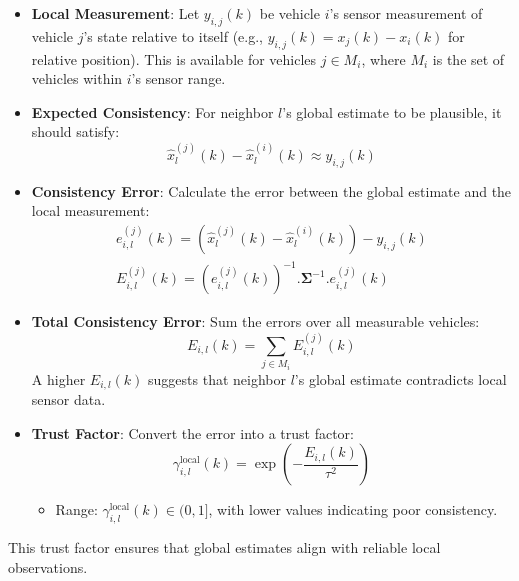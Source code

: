 \documentclass[letterpaper, 10pt, conference]{ieeeconf}  %
\begin{document}
\begin{itemize}
    \item \textbf{Local Measurement}: Let \( y_{i,j}(k) \) be vehicle \( i \)'s sensor measurement of vehicle \( j \)'s state relative to itself (e.g., \( y_{i,j}(k) = x_j(k) - x_i(k) \) for relative position). This is available for vehicles \( j \in M_i \), where \( M_i \) is the set of vehicles within \( i \)'s sensor range.

    \item \textbf{Expected Consistency}: For neighbor \( l \)'s global estimate to be plausible, it should satisfy:
    \[
    \hat{x}_l^{(j)}(k) - \hat{x}_l^{(i)}(k) \approx y_{i,j}(k)
    \]

    \item \textbf{Consistency Error}: Calculate the error between the global estimate and the local measurement:
    \begin{align}
    e_{i,l}^{(j)}(k) = \left( \hat{x}_l^{(j)}(k) - \hat{x}_l^{(i)}(k) \right) - y_{i,j}(k) \\
    E_{i,l}^{(j)}(k) = (e_{i,l}^{(j)}(k))^{-1}. \mathbf{\Sigma}^{-1}. e_{i,l}^{(j)}(k)
    \end{align}

    \item \textbf{Total Consistency Error}: Sum the errors over all measurable vehicles:
    \[
    E_{i,l}(k) = \sum_{j \in M_i} E_{i,l}^{(j)}(k)
    \]
    A higher \( E_{i,l}(k) \) suggests that neighbor \( l \)'s global estimate contradicts local sensor data.

    \item \textbf{Trust Factor}: Convert the error into a trust factor:
    \[
    \gamma_{i,l}^{\text{local}}(k) = \exp\left( -\frac{E_{i,l}(k)}{\tau^2} \right)
    \]
    \begin{itemize}
        \item Range: \( \gamma_{i,l}^{\text{local}}(k) \in (0, 1] \), with lower values indicating poor consistency.
    \end{itemize}
\end{itemize}

This trust factor ensures that global estimates align with reliable local observations.
\end{document}
